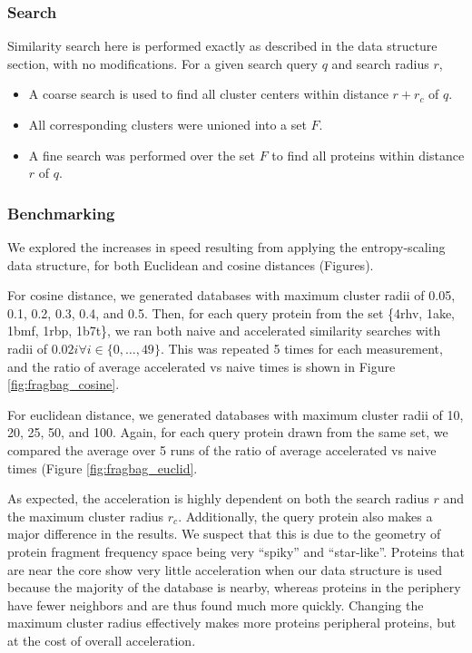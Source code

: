 \documentclass[review,preprint,12pt]{elsarticle}
\theoremstyle{definition}
\theoremstyle{remark}
\numberwithin{equation}{section}
\begin{document}
\subsubsection{Search}
Similarity search here is performed exactly as described in the data structure section, with no modifications.
For a given search query $q$ and search radius $r$,
\begin{itemize}
    \item A coarse search is used to find all cluster centers within distance $r+r_c$ of $q$.
    \item All corresponding clusters were unioned into a set $F$.
    \item A fine search was performed over the set $F$ to find all proteins within distance $r$ of $q$.
\end{itemize}

\subsubsection{Benchmarking}
We explored the increases in speed resulting from applying the entropy-scaling data structure, for both Euclidean and cosine distances (Figures).

For cosine distance, we generated databases with maximum cluster radii of 0.05, 0.1, 0.2, 0.3, 0.4, and 0.5.
Then, for each query protein from the set \{4rhv, 1ake, 1bmf, 1rbp, 1b7t\}, we ran both naive and accelerated similarity searches with radii of $0.02i \forall i \in \{0,\ldots,49\}$.
This was repeated 5 times for each measurement, and the ratio of average accelerated vs naive times is shown in Figure \ref{fig:fragbag_cosine}.

For euclidean distance, we generated databases with maximum cluster radii of 10, 20, 25, 50, and 100.
Again, for each query protein drawn from the same set, we compared the average over 5 runs of the ratio of average accelerated vs naive times (Figure \ref{fig:fragbag_euclid}.

As expected, the acceleration is highly dependent on both the search radius $r$ and the maximum cluster radius $r_c$.
Additionally, the query protein also makes a major difference in the results.
We suspect that this is due to the geometry of protein fragment frequency space being very ``spiky'' and ``star-like''.
Proteins that are near the core show very little acceleration when our data structure is used because the majority of the database is nearby, whereas proteins in the periphery have fewer neighbors and are thus found much more quickly.
Changing the maximum cluster radius effectively makes more proteins peripheral proteins, but at the cost of overall acceleration.
\end{document}
